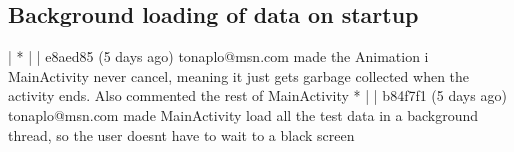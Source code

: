 \subsection{Background loading of data on startup}
| * | | e8aed85 (5 days ago) tonaplo@msn.com made the Animation i MainActivity never cancel, meaning it just gets garbage collected when the activity ends. Also commented the rest of MainActivity
* | | b84f7f1 (5 days ago) tonaplo@msn.com made MainActivity load all the test data in a background thread, so the user doesnt have to wait to a black screen
